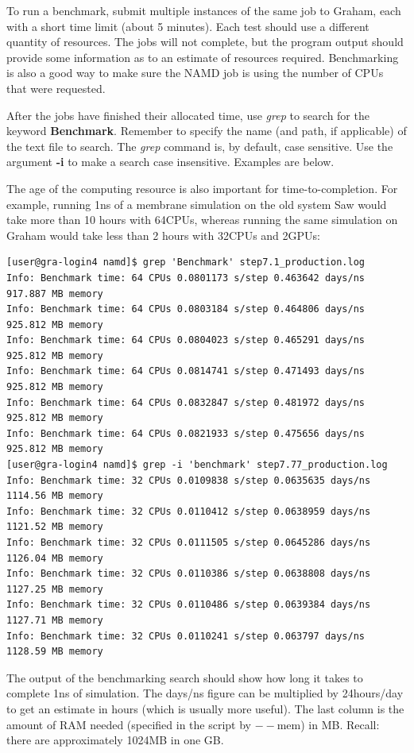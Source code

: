\documentclass[12pt]{article}
\begin{document}
\quad To run a benchmark, submit multiple instances of the same job to Graham, each with a short time limit (about 5 minutes). Each test should use a different quantity of resources. The jobs will not complete,  but the program output should provide some information as to an estimate of resources required. Benchmarking is also a good way to make sure the NAMD job is using the number of CPUs that were requested.

\quad After the jobs have finished their allocated time, use \textit{grep} to search for the keyword \textbf{Benchmark}. Remember to specify the name (and path, if applicable) of the text file to search. The \textit{grep} command is, by default, case sensitive. Use the argument \textbf{-i} to make a search case insensitive. Examples are below.


\quad The age of the computing resource is also important for time-to-completion. For example, running 1ns of a membrane simulation on the old system Saw would take more than 10 hours with 64CPUs, whereas running the same simulation on Graham would take less than 2 hours with 32CPUs and 2GPUs: 

\begin{lstlisting}[numbers=none, basicstyle=\scriptsize]
[user@gra-login4 namd]$ grep 'Benchmark' step7.1_production.log 
Info: Benchmark time: 64 CPUs 0.0801173 s/step 0.463642 days/ns 917.887 MB memory
Info: Benchmark time: 64 CPUs 0.0803184 s/step 0.464806 days/ns 925.812 MB memory
Info: Benchmark time: 64 CPUs 0.0804023 s/step 0.465291 days/ns 925.812 MB memory
Info: Benchmark time: 64 CPUs 0.0814741 s/step 0.471493 days/ns 925.812 MB memory
Info: Benchmark time: 64 CPUs 0.0832847 s/step 0.481972 days/ns 925.812 MB memory
Info: Benchmark time: 64 CPUs 0.0821933 s/step 0.475656 days/ns 925.812 MB memory
[user@gra-login4 namd]$ grep -i 'benchmark' step7.77_production.log
Info: Benchmark time: 32 CPUs 0.0109838 s/step 0.0635635 days/ns 1114.56 MB memory
Info: Benchmark time: 32 CPUs 0.0110412 s/step 0.0638959 days/ns 1121.52 MB memory
Info: Benchmark time: 32 CPUs 0.0111505 s/step 0.0645286 days/ns 1126.04 MB memory
Info: Benchmark time: 32 CPUs 0.0110386 s/step 0.0638808 days/ns 1127.25 MB memory
Info: Benchmark time: 32 CPUs 0.0110486 s/step 0.0639384 days/ns 1127.71 MB memory
Info: Benchmark time: 32 CPUs 0.0110241 s/step 0.063797 days/ns 1128.59 MB memory

\end{lstlisting} 

\quad The output of the benchmarking search should show how long it takes to complete 1ns of simulation. The days/ns figure can be multiplied by 24hours/day to get an estimate in hours (which is usually more useful). The last column is the amount of RAM needed (specified in the script by $--$mem) in MB. Recall: there are approximately 1024MB in one GB. 
\end{document}
